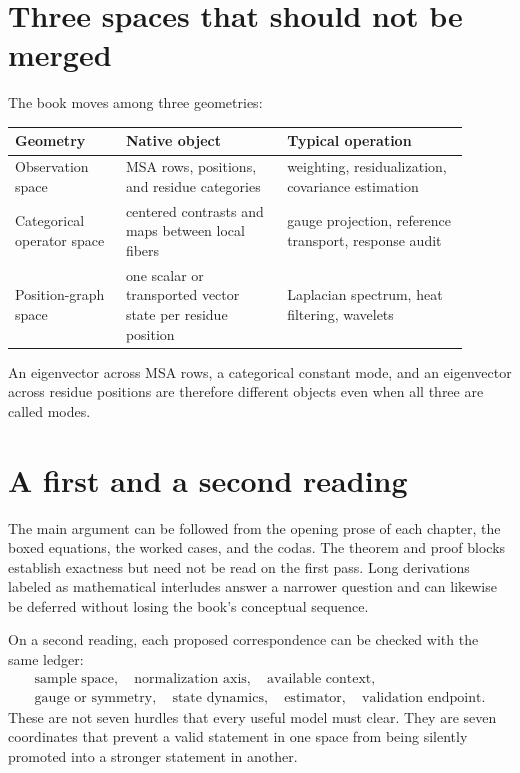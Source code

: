 \clearpage
\section*{Three spaces that should not be merged}

The book moves among three geometries:
\begin{center}
\small
\begin{tabular}{@{}>{\raggedright\arraybackslash}p{0.22\linewidth}
                >{\raggedright\arraybackslash}p{0.32\linewidth}
                >{\raggedright\arraybackslash}p{0.36\linewidth}@{}}
\toprule
Geometry & Native object & Typical operation \\
\midrule
Observation space & MSA rows, positions, and residue categories & weighting, residualization, covariance estimation \\
Categorical operator space & centered contrasts and maps between local fibers & gauge projection, reference transport, response audit \\
Position-graph space & one scalar or transported vector state per residue position & Laplacian spectrum, heat filtering, wavelets \\
\bottomrule
\end{tabular}
\end{center}
An eigenvector across MSA rows, a categorical constant mode, and an eigenvector across residue
positions are therefore different objects even when all three are called modes.

\section*{A first and a second reading}

The main argument can be followed from the opening prose of each chapter, the boxed equations,
the worked cases, and the codas.  The theorem and proof blocks establish exactness but need not be
read on the first pass.  Long derivations labeled as mathematical interludes answer a narrower
question and can likewise be deferred without losing the book's conceptual sequence.

On a second reading, each proposed correspondence can be checked with the same ledger:
\begin{equation*}
\begin{gathered}
\text{sample space},\quad
\text{normalization axis},\quad
\text{available context},\\
\text{gauge or symmetry},\quad
\text{state dynamics},\quad
\text{estimator},\quad
\text{validation endpoint}.
\end{gathered}
\end{equation*}
These are not seven hurdles that every useful model must clear.  They are seven coordinates that
prevent a valid statement in one space from being silently promoted into a stronger statement in
another.
